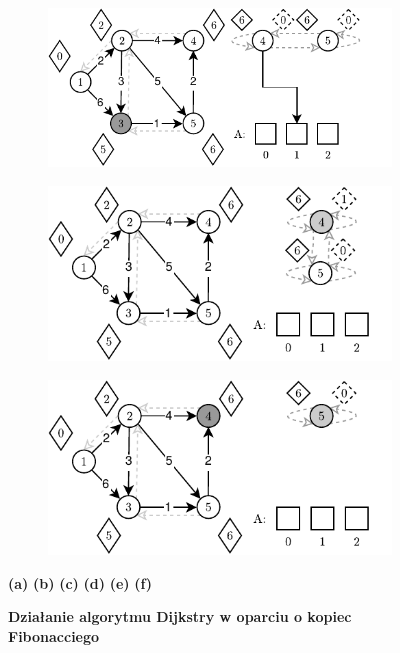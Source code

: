 \begin{figure}[!htbp]
\begin{subfigure}[b]{0.45\textwidth}
		\caption{}
	\end{subfigure}%
	\begin{subfigure}[b]{0.45\textwidth}
		\includegraphics[width=\textwidth]{Chapter_II/FIBONACCI-Example/d.pdf}
		\caption{}
	\end{subfigure}
	\begin{subfigure}[b]{0.45\textwidth}
		\includegraphics[width=\textwidth]{Chapter_II/FIBONACCI-Example/e.pdf}
		\caption{}
	\end{subfigure}%
	\begin{subfigure}[b]{0.45\textwidth}
		\includegraphics[width=\textwidth]{Chapter_II/FIBONACCI-Example/f.pdf}
		\caption{}
	\end{subfigure}
	\caption{\textbf{Działanie algorytmu Dijkstry w oparciu o kopiec Fibonacciego}} \textbf{(a)} \textbf{(b)} \textbf{(c)} \textbf{(d)} \textbf{(e)} \textbf{(f)} \label{fig:exampleFibonacci}
\end{figure}

